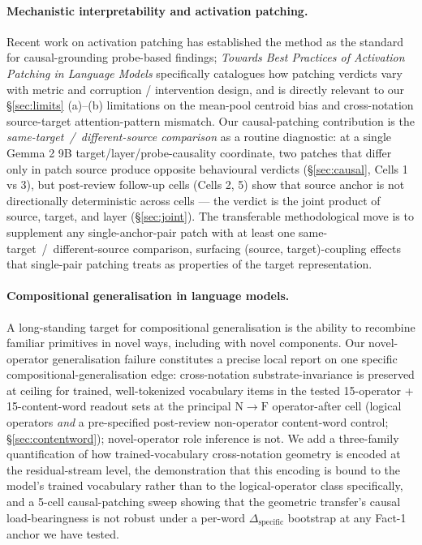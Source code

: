 \documentclass[11pt,letterpaper]{article}
\newcommand{\dspec}{\ensuremath{\Delta_{\text{specific}}}}
\newcommand{\NtoF}{\ensuremath{\mathrm{N}\!\to\!\mathrm{F}}}
\begin{document}
\paragraph{Mechanistic interpretability and activation patching.}
Recent work on activation patching
\citep{geiger2021causal,meng2022rome,heimersheim2024patching,zhang2024patchingbest}
has established the method as the standard for causal-grounding
probe-based findings; \citet{zhang2024patchingbest} \emph{Towards Best
Practices of Activation Patching in Language Models} specifically
catalogues how patching verdicts vary with metric and corruption /
intervention design, and is directly relevant to our \S\ref{sec:limits}
(a)--(b) limitations on the mean-pool centroid bias and cross-notation
source-target attention-pattern mismatch. Our causal-patching
contribution is the \emph{same-target~/~different-source comparison}
as a routine diagnostic: at a single Gemma 2 9B
target/layer/probe-causality coordinate, two patches that differ only
in patch source produce opposite behavioural verdicts
(\S\ref{sec:causal}, Cells 1 vs 3), but post-review follow-up
cells (Cells 2, 5) show that source anchor is not directionally
deterministic across cells --- the verdict is the joint product of
source, target, and layer (\S\ref{sec:joint}). The transferable
methodological move is to supplement any single-anchor-pair patch with
at least one same-target~/~different-source comparison, surfacing
(source, target)-coupling effects that single-pair patching treats as
properties of the target representation.

\paragraph{Compositional generalisation in language models.}
A long-standing target for compositional generalisation
\citep{lake2018scan,hupkes2020compositionality,saxton2019math} is the
ability to recombine familiar primitives in novel ways, including with
novel components. Our novel-operator generalisation failure
constitutes a precise local report on one specific
compositional-generalisation edge: cross-notation
substrate-invariance is preserved at ceiling for trained,
well-tokenized vocabulary items in the tested 15-operator +
15-content-word readout sets at the principal \NtoF{} operator-after
cell (logical operators \emph{and} a pre-specified post-review
non-operator content-word control; \S\ref{sec:contentword});
novel-operator role inference is not. We add a three-family
quantification of how trained-vocabulary cross-notation geometry is
encoded at the residual-stream level, the demonstration that this
encoding is bound to the model's trained vocabulary rather than to the
logical-operator class specifically, and a 5-cell causal-patching
sweep showing that the geometric transfer's causal load-bearingness is
not robust under a per-word \dspec{} bootstrap at any Fact-1 anchor we
have tested.
\end{document}
